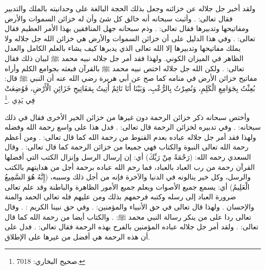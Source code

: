 ولقد أخبر جل جلاله عن خزائنه وجعل بذلك الحجة البالغة على وحدانيته بالملك والتدبير فقال تعالى: 
\quranayah*[52][37]{\footnotesize \surahname*[52]}. وأثبت سبحانه أنه خالق كل شئ وأن له خزائن السموات والأرض ومفاتيحها وتدبيرها فقال تعالى: 
\quranayah*[39][62-63]{\footnotesize \surahname*[39]}. وذم سبحانه جهل المنافقين بهذا الأمر العظيم فقال تعالى: \quranayah*[63][7][13]{\footnotesize \surahname*[63]}. وفي هذا الدليل على أن خزائن السموات والأرض هي خزائن الله جل جلاله ولا يملك مفاتيحها وتدبيرها إلا الله تعالى الذي يدبرها كيف يشاء بالعلم الكامل والعدل الظاهر في الميزان الكوني. ولهذا فقد أمر جل جلاله نبيه محمد ﷺ لبيان ذلك فقال تعالى: \quranayah*[6][50]{\footnotesize \surahname*[6]}. ولكن الله جل جلاله اختص نبيه محمد ﷺ بالقرآن فبعثه بجوامع الكلم وأراه مفاتيح خزائن الأرض في منامه كما صح عن أبي هريرة رضي الله عنه أن النبي ﷺ قال: بُعِثْتُ بِجَوَامِعِ الْكَلِمِ، وَنُصِرْتُ بِالرُّعْبِ، وَبَيْنَا أَنَا نَائِمٌ أُتِيتُ بِمَفَاتِيحِ خَزَائِنِ الْأَرْضِ، فَوُضِعَتْ فِي يَدِي \href{https://shamela.ws/book/1284/4398#p2}{\faExternalLink} \cite{bukhari}.\footnote{صحيح البخاري: 7018.} 

وأختص سبحانه ذكر خزائن الرحمة دون غيرها من خزائن الخير الأخرى فقال في ذلك سبحانه: 
\quranayah*[38][9]{\footnotesize \surahname*[38]}. وفي تدبيره لخزائن الرحمة قال تعالى: 
\quranayah*[17][100]{\footnotesize \surahname*[17]}. فدل هذا على واسع رحمة الله وفضله ولهذا فقد أمر جل جلاله عباده بعدم القنوط من رحمة الله كما قال تعالى: 
\quranayah*[39][53]{\footnotesize \surahname*[39]}. 
ومن أعظم رحمة الله تعالى النبوة والكتاب فهي جميعا من خزائن الرحمة كما قال تعالى: 
\quranayah*[44][6]{\footnotesize \surahname*[44]}. وقال السعدي رحمه الله: (رَحْمَةً مِنْ رَبِّكَ) أي: إن إرسال الرسل وإنزال الكتب التي أفضلها القرآن رحمة من رب العباد بالعباد، فما رحم الله عباده برحمة أجل من هدايتهم بالكتب والرسل، وكل خير ينالونه في الدنيا والآخرة فإنه من أجل ذلك وسببه، (إِنَّهُ هُوَ السَّمِيعُ الْعَلِيمُ) أي: يسمع جميع الأصوات ويعلم جميع الأمور الظاهرة والباطنة وقد علم تعالى ضرورة العباد إلى رسله وكتبه فرحمهم بذلك ومن عليهم فله تعالى الحمد والمنة والإحسان \href{https://shamela.ws/book/42/1753#p4}{\faExternalLink} \cite{tafsir_Saadi}.
ولهذا قال تعالى في حق الأنبياء والمؤمنين: 
\quranayah*[3][74]{\footnotesize \surahname*[3]}.
وفي حق نبينا الكريم : 
\quranayah*[21][107]{\footnotesize \surahname*[21]}.  وقال تعالى ردا على من ينكر رسالة النبي محمد ﷺ: \quranayah*[43][32]{\footnotesize \surahname*[43]}. والكتاب أيضا من رحمة الله كما قال تعالى: 
\quranayah*[31][2-3]{\footnotesize \surahname*[31]}. ولقد أمر جل جلاله عباده المؤمنين بالفرح بهذه الرحمة فقال تعالى: 
\quranayah*[10][57-58]{\footnotesize \surahname*[10]}. فدل على أن هذه الرحمة هي أفضل من غيرها على الإطلاق.

